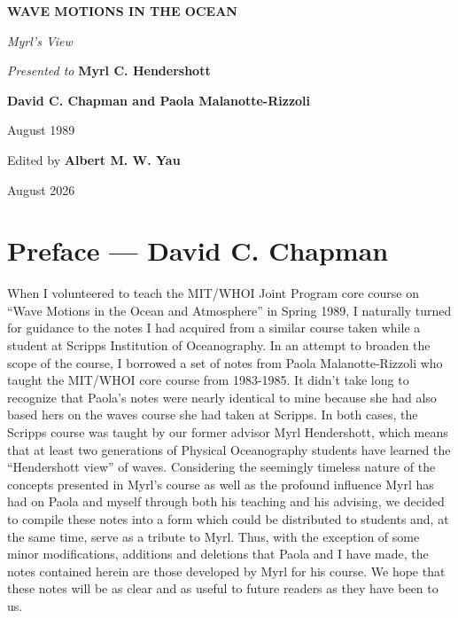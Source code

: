 \begin{wavepdfonly}
	
	
\end{wavepdfonly}
\begin{wavewebonly}
	\thispagestyle{empty}
	\begin{center}
		\vspace*{0.78in}
		{\sffamily\color{WaveAccent}\fontsize{27}{31}\selectfont\bfseries WAVE MOTIONS IN THE OCEAN\par}
		\vspace{0.22in}
		{\fontsize{18}{22}\selectfont\itshape Myrl's View\par}
		\vspace{0.82in}
		{\large \textit{Presented to} \textbf{Myrl C. Hendershott}\par}
		\vfill
		{\large \textbf{David C. Chapman and Paola Malanotte-Rizzoli}\par}
		\vspace{0.10in}
		{\normalsize August 1989\par}
		\vfill
		{\small\sffamily Edited by \textbf{Albert M. W. Yau}\par}
		\vspace{0.08in}
		{\small\sffamily August 2026\par}
	\end{center}
\end{wavewebonly}
\clearpage
\nopagecolor

\chapter*{Preface --- David C. Chapman}
When I volunteered to teach the MIT/WHOI Joint Program core course on
``Wave Motions in the Ocean and Atmosphere'' in Spring 1989, I naturally turned for
guidance to the notes I had acquired from a similar course taken while a student at
Scripps Institution of Oceanography. In an attempt to broaden the scope of the course,
I borrowed a set of notes from Paola Malanotte-Rizzoli who taught the MIT/WHOI
core course from 1983-1985. It didn't take long to recognize that Paola's notes were
nearly identical to mine because she had also based hers on the waves course she had
taken at Scripps. In both cases, the Scripps course was taught by our former advisor
Myrl Hendershott, which means that at least two generations of Physical
Oceanography students have learned the ``Hendershott view'' of waves. Considering
the seemingly timeless nature of the concepts presented in Myrl's course as well as the
profound influence Myrl has had on Paola and myself through both his teaching and
his advising, we decided to compile these notes into a form which could be distributed
to students and, at the same time, serve as a tribute to Myrl. Thus, with the exception
of some minor modifications, additions and deletions that Paola and I have made, the
notes contained herein are those developed by Myrl for his course. We hope that these
notes will be as clear and as useful to future readers as they have been to us.

